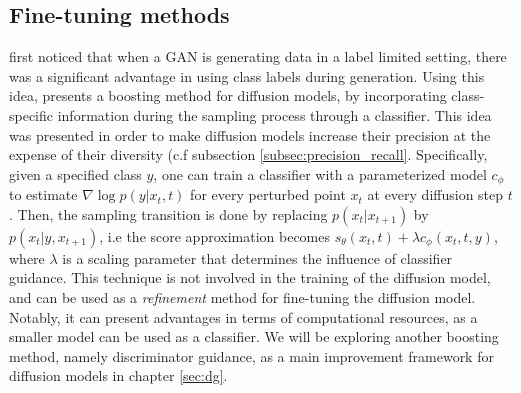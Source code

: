 \subsection{Fine-tuning methods}
\citep{lucic2019highfidelityimagegenerationfewer} first noticed that when a GAN is generating data in a label limited setting, there was a significant advantage in using class labels during generation. Using this idea, \citep{dhariwal2021diffusionmodelsbeatgans} presents a boosting method for diffusion models, by incorporating class-specific information during the sampling process through a classifier. This idea was presented in order to make diffusion models increase their precision at the expense of their diversity (c.f subsection \ref{subsec:precision_recall}.
Specifically, given a specified class $y$, one can train a classifier with a parameterized model $c_{\phi}$ to estimate $\nabla \log p(y|x_{t},t)$ for every perturbed point $x_{t}$ at every diffusion step $t$. Then, the sampling transition is done by replacing $p(x_{t}|x_{t+1})$ by $p(x_{t}|y,x_{t+1})$, i.e the score approximation becomes $s_{\theta}(x_{t},t) + \lambda c_{\phi}(x_{t},t,y)$, where $\lambda$ is a scaling parameter that determines the influence of classifier guidance. This technique is not involved in the training of the diffusion model, and can be used as a \textit{refinement} method for fine-tuning the diffusion model. Notably, it can present advantages in terms of computational resources, as a smaller model can be used as a classifier. We will be exploring another boosting method, namely discriminator guidance, as a main improvement framework for diffusion models in chapter \ref{sec:dg}.


